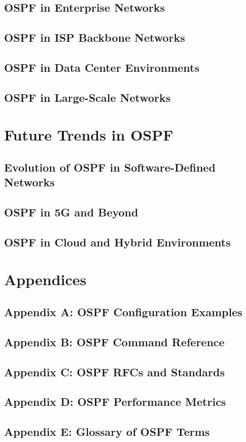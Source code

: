 \documentclass{book}
\begin{document}
    \section{OSPF in Enterprise Networks}
    \section{OSPF in ISP Backbone Networks}
    \section{OSPF in Data Center Environments}
    \section{OSPF in Large-Scale Networks}

\chapter{Future Trends in OSPF}
    \section{Evolution of OSPF in Software-Defined Networks}
    \section{OSPF in 5G and Beyond}
    \section{OSPF in Cloud and Hybrid Environments}
    
\chapter{Appendices}
    \section{Appendix A: OSPF Configuration Examples}
    \section{Appendix B: OSPF Command Reference}
    \section{Appendix C: OSPF RFCs and Standards}
    \section{Appendix D: OSPF Performance Metrics}
    \section{Appendix E: Glossary of OSPF Terms}
    
\end{document}
